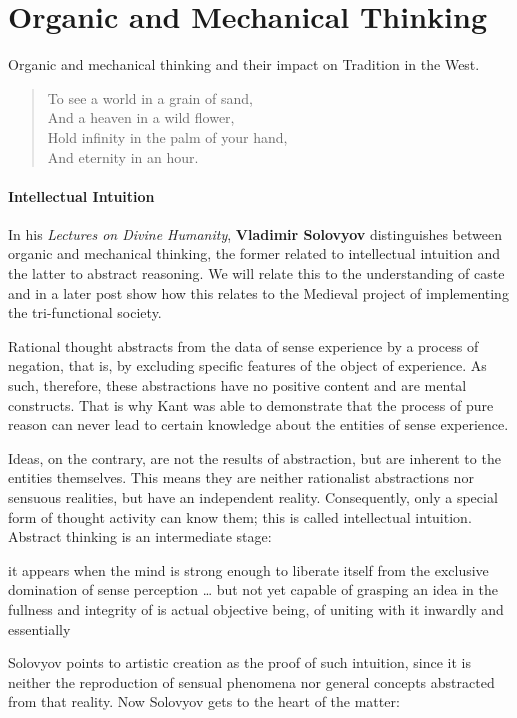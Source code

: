 \section{Organic and Mechanical Thinking}

\label{sec:OrganicandMechanicalThinking}

Organic and mechanical thinking and their impact on Tradition in the West.

\begin{quotex}
\begin{verse}
To see a world in a grain of sand,\\
And a heaven in a wild flower,\\
Hold infinity in the palm of your hand,\\
And eternity in an hour.
\end{verse}

\end{quotex}
\paragraph{Intellectual Intuition}
In his \textit{Lectures on Divine Humanity}, \textbf{Vladimir Solovyov} distinguishes between organic and mechanical thinking, the former related to intellectual intuition and the latter to abstract reasoning. We will relate this to the understanding of caste and in a later post show how this relates to the Medieval project of implementing the tri-functional society.

Rational thought abstracts from the data of sense experience by a process of negation, that is, by excluding specific features of the object of experience. As such, therefore, these abstractions have no positive content and are mental constructs. That is why Kant was able to demonstrate that the process of pure reason can never lead to certain knowledge about the entities of sense experience.

Ideas, on the contrary, are not the results of abstraction, but are inherent to the entities themselves. This means they are neither rationalist abstractions nor sensuous realities, but have an independent reality. Consequently, only a special form of thought activity can know them; this is called intellectual intuition. Abstract thinking is an intermediate stage:

\begin{quotex}
it appears when the mind is strong enough to liberate itself from the exclusive domination of sense perception … but not yet capable of grasping an idea in the fullness and integrity of is actual objective being, of uniting with it inwardly and essentially 

\end{quotex}
Solovyov points to artistic creation as the proof of such intuition, since it is neither the reproduction of sensual phenomena nor general concepts abstracted from that reality. Now Solovyov gets to the heart of the matter:

